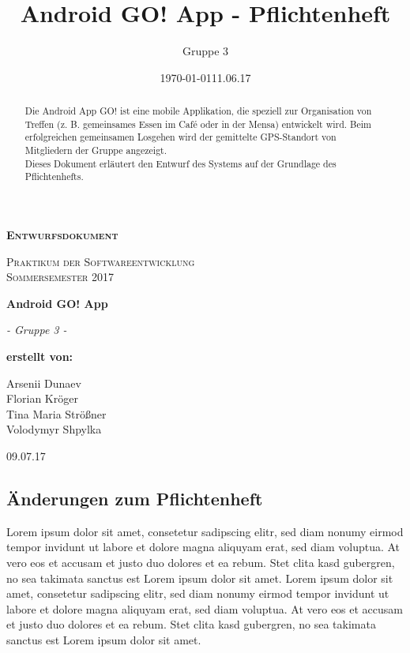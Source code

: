 \documentclass[11pt,a4paper]{report}
\date{\today}
\title{Android GO! App - Pflichtenheft}
\author{Gruppe 3}
\date{11.06.17}
\begin{document}
\begin{titlepage}
	\begin{center}
	{\scshape\LARGE \bfseries Entwurfsdokument \par}
	\vspace{1cm}
	{\scshape\Large Praktikum der Softwareentwicklung \\ Sommersemester 2017\par}
	\vspace{1.5cm}
	{\huge\bfseries Android GO! App\par}
	\vspace{2cm}
	{\Large\itshape - Gruppe 3 -\par}
	\vfill
	{\bfseries erstellt von:\par}
	Arsenii Dunaev \\
	Florian Kröger \\
	Tina Maria Strößner \\
	Volodymyr Shpylka \\	
	\vfill
	{\large 09.07.17 \par}	
	\end{center}
\end{titlepage}

\begin{abstract}
Die Android App GO! ist eine mobile Applikation, die speziell zur Organisation von Treffen (z. B. gemeinsames Essen im Café oder in der Mensa) entwickelt wird. Beim erfolgreichen gemeinsamen Losgehen wird der gemittelte GPS-Standort von Mitgliedern der Gruppe angezeigt.\\

Dieses Dokument erläutert den Entwurf des Systems auf der Grundlage des Pflichtenhefts.
\end{abstract}


\sloppy
{}
\tableofcontents




\subsection{Änderungen zum Pflichtenheft}

Lorem ipsum dolor sit amet, consetetur sadipscing elitr, sed diam nonumy eirmod tempor invidunt ut labore et dolore magna aliquyam erat, sed diam voluptua. At vero eos et accusam et justo duo dolores et ea rebum. Stet clita kasd gubergren, no sea takimata sanctus est Lorem ipsum dolor sit amet. Lorem ipsum dolor sit amet, consetetur sadipscing elitr, sed diam nonumy eirmod tempor invidunt ut labore et dolore magna aliquyam erat, sed diam voluptua. At vero eos et accusam et justo duo dolores et ea rebum. Stet clita kasd gubergren, no sea takimata sanctus est Lorem ipsum dolor sit amet.
\end{document}
